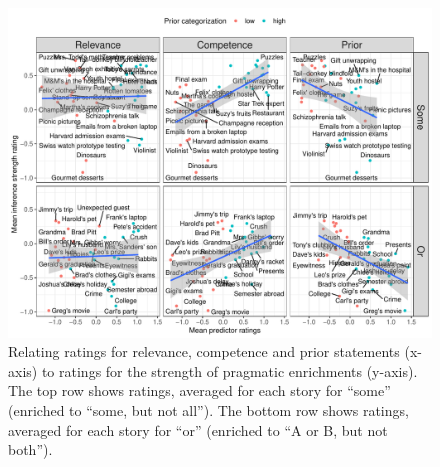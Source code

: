\documentclass[11pt,letterpaper]{article}
\begin{document}
\newpage



\begin{figure}
  \includegraphics[scale=0.5]{byItem-ratings.pdf}
 \caption{Relating ratings for relevance, competence and prior statements (x-axis) to
ratings for the strength of pragmatic enrichments (y-axis). The top row shows ratings,
averaged for each story for ``some'' (enriched to ``some, but not all''). The bottom row shows ratings, averaged for each story for ``or'' (enriched to ``A or B, but not both'').}
    \label{by-item-ratings}
\end{figure}
\end{document}
